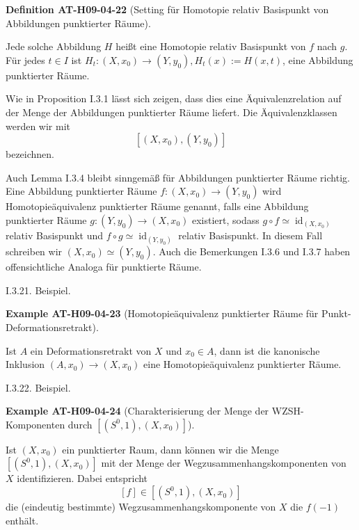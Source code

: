 \documentclass[10pt, letterpaper]{article}
\newcommand{\CustomHeading}[3]{%
  \par\medskip\noindent%
  \textbf{#1 #2} \textnormal{(#3)}.\enskip%
}
\newenvironment{DEF}[2]{\begin{unitbox}\CustomHeading{Definition}{#1}{#2}}{\end{unitbox}}
\newenvironment{EXA}[2]{\begin{unitbox}\CustomHeading{Example}{#1}{#2}}{\end{unitbox}}
\begin{document}
\begin{DEF}{AT-H09-04-22}{Setting für Homotopie relativ Basispunkt von Abbildungen punktierter Räume}
Jede solche Abbildung $H$ heißt eine Homotopie relativ Basispunkt von $f$ nach $g$. Für jedes $t \in I$ ist $H_{t}:\left(X, x_{0}\right) \rightarrow\left(Y, y_{0}\right), H_{t}(x):=H(x, t)$, eine Abbildung punktierter Räume. 

Wie in Proposition I.3.1 lässt sich zeigen, dass dies eine Äquivalenzrelation auf der Menge der Abbildungen punktierter Räume liefert. Die Äquivalenzklassen werden wir mit 
$$\left[\left(X, x_{0}\right),\left(Y, y_{0}\right)\right]$$ 
bezeichnen. 

Auch Lemma I.3.4 bleibt sinngemäß für Abbildungen punktierter Räume richtig. Eine Abbildung punktierter Räume $f:\left(X, x_{0}\right) \rightarrow\left(Y, y_{0}\right)$ wird Homotopieäquivalenz punktierter Räume genannt, falls eine Abbildung punktierter Räume $g:\left(Y, y_{0}\right) \rightarrow\left(X, x_{0}\right)$ existiert, sodass $g \circ f \simeq \operatorname{id}_{\left(X, x_{0}\right)}$ relativ Basispunkt und $f \circ g \simeq \operatorname{id}_{\left(Y, y_{0}\right)}$ relativ Basispunkt. In diesem Fall schreiben wir $\left(X, x_{0}\right) \simeq\left(Y, y_{0}\right)$. Auch die Bemerkungen I.3.6 und I.3.7 haben offensichtliche Analoga für punktierte Räume.
\end{DEF}



I.3.21. Beispiel. 

\begin{EXA}{AT-H09-04-23}{Homotopieäquivalenz punktierter Räume für Punkt-Deformationsretrakt}
Ist $A$ ein Deformationsretrakt von $X$ und $x_{0} \in A$, dann ist die kanonische Inklusion $\left(A, x_{0}\right) \rightarrow\left(X, x_{0}\right)$ eine Homotopieäquivalenz punktierter Räume.
\end{EXA}


I.3.22. Beispiel. 


\begin{EXA}{AT-H09-04-24}{Charakterisierung der Menge der WZSH-Komponenten durch  $\left[\left(S^{0}, 1\right),\left(X, x_{0}\right)\right]$}
Ist $(X, x_{0})$ ein punktierter Raum, dann können wir die Menge $\left[\left(S^{0}, 1\right),\left(X, x_{0}\right)\right]$ mit der Menge der Wegzusammenhangskomponenten von $X$ identifizieren. Dabei entspricht 
$$[f] \in\left[\left(S^{0}, 1\right),\left(X, x_{0}\right)\right]$$ 
die (eindeutig bestimmte) Wegzusammenhangskomponente von $X$ die $f(-1)$ enthält.
\end{EXA}
\end{document}
